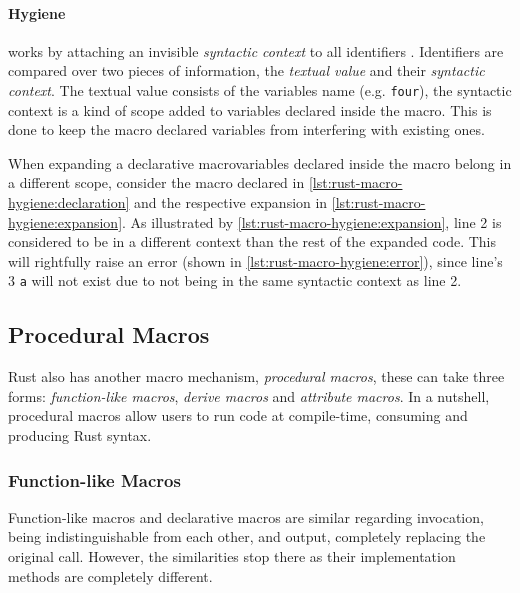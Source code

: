 \paragraph{Hygiene} works by attaching an invisible \emph{syntactic context} to all identifiers \autocite{Wirth2021}.
Identifiers are compared over two pieces of information,
the \emph{textual value} and their \emph{syntactic context}.
The textual value consists of the variables name (e.g. \texttt{four}),
the syntactic context is a kind of scope added to variables declared inside the macro.
This is done to keep the macro declared variables from interfering with existing ones.

When expanding a declarative macro\footnotemark variables declared inside the macro belong in a different scope,
consider the macro declared in \autoref{lst:rust-macro-hygiene:declaration} and
the respective expansion in \autoref{lst:rust-macro-hygiene:expansion}.
As illustrated by \autoref{lst:rust-macro-hygiene:expansion},
line 2 is considered to be in a different context than the rest of the expanded code.
This will rightfully raise an error (shown in \autoref{lst:rust-macro-hygiene:error}),
since line's 3 \texttt{a} will not exist due to not being in the same syntactic context as line 2.











\subsection{Procedural Macros}\label{sec:rust-macros:proc}
Rust also has another macro mechanism, \emph{procedural macros},
these can take three forms: \emph{function-like macros}, \emph{derive macros} and \emph{attribute macros}.
In a nutshell, procedural macros allow users to run code at compile-time, consuming and producing Rust syntax.

\subsubsection*{Function-like Macros}
Function-like macros and declarative macros are similar regarding invocation, being indistinguishable from each other,
and output, completely replacing the original call.
However, the similarities stop there as their implementation methods are completely different.

